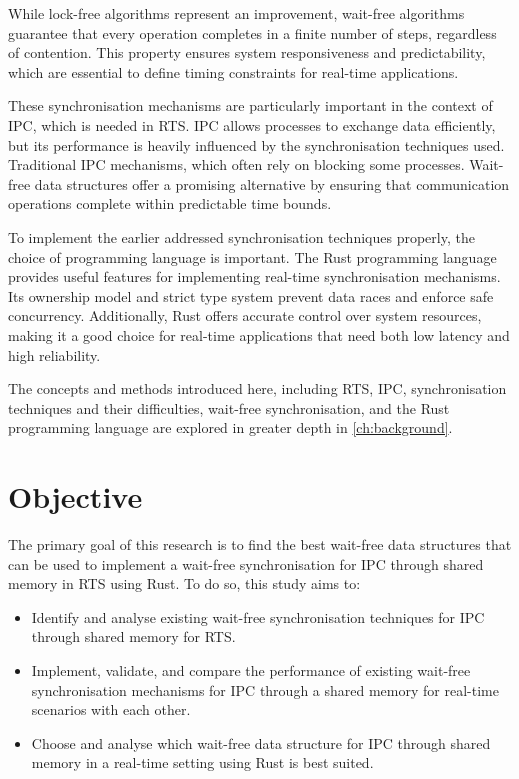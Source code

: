 While lock-free algorithms represent an improvement, wait-free algorithms guarantee that every operation completes in a finite number of steps, regardless of contention. This property ensures system responsiveness and predictability, which are essential to define timing constraints for real-time applications. \cite{kogan2012methodology, herlihy1991wait, brandenburg2019multiprocessorrealtimelockingprotocols}

These synchronisation mechanisms are particularly important in the context of \ac{IPC}, which is needed in \ac{RTS}. \ac{IPC} allows processes to exchange data efficiently, but its performance is heavily influenced by the synchronisation techniques used. Traditional \ac{IPC} mechanisms, which often rely on blocking some processes. Wait-free data structures offer a promising alternative by ensuring that communication operations complete within predictable time bounds. \cite{timnat2014practical, michael1996simple, huang2002improvingWaitFree, pellegrini2020relevancewaitfreecoordinationalgorithms}

To implement the earlier addressed synchronisation techniques properly, the choice of programming language is important. The Rust programming language provides useful features for implementing real-time synchronisation mechanisms. Its ownership model and strict type system prevent data races and enforce safe concurrency. Additionally, Rust offers accurate control over system resources, making it a good choice for real-time applications that need both low latency and high reliability. \cite{xu2023rust, sharma2024rustembeddedsystemscurrent}

The concepts and methods introduced here, including \ac{RTS}, \ac{IPC}, synchronisation techniques and their difficulties, wait-free synchronisation, and the Rust programming language are explored in greater depth in \cref{ch:background}. 

\section{Objective}\label{sec:objective}
The primary goal of this research is to find the best wait-free data structures that can be used to implement a wait-free synchronisation for \ac{IPC} through shared memory in \ac{RTS} using Rust. To do so, this study aims to:

\begin{itemize}
\item Identify and analyse existing wait-free synchronisation techniques for \ac{IPC} through shared memory for \ac{RTS}.
\item Implement, validate, and compare the performance of existing wait-free synchronisation mechanisms for \ac{IPC} through a shared memory for real-time scenarios with each other.
\item Choose and analyse which wait-free data structure for \ac{IPC} through shared memory in a real-time setting using Rust is best suited.
\end{itemize}


